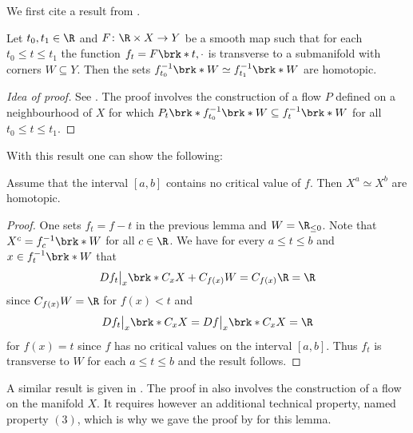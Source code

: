 % 
We first cite a result from \cite{Agrach1991}.
\begin{proposition}
  \label{pr:Morse_TransversalityLemma}
  Let $t_0,t_1\in\R$ and $F\colon \R\times X\to Y$ be a smooth map such that for each $t_0\leq t\leq t_1$ the function
  $f_t=F\brk*{t,\cdot}$ is transverse to a submanifold with corners $W\subseteq Y$.
  Then the sets $f_{t_0}^{-1}\brk*{W}\simeq f_{t_1}^{-1}\brk*{W}$
  are homotopic.
\end{proposition}
\begin{proof}[Idea of proof]
  See \cite[Theorem 2.1]{Agrach1991}.
  The proof involves the construction of a flow $P$ defined on a neighbourhood of $X$
  for which $P_t\brk*{f_{t_0}^{-1}\brk*{W}}\subseteq f_{t}^{-1}\brk*{W}$ for all $t_0\leq t\leq t_1$.
\end{proof}
With this result one can show the following:
\begin{lemma}
  \label{le:Morse_homotopicNoCP}
  Assume that the interval $[a,b]$ contains no critical value of $f$.
  Then $X^a\simeq X^b$ are homotopic.
\end{lemma}
\begin{proof}
  One sets $f_t=f-t$ in the previous lemma and $W=\R_{\leq0}$.
  Note that $X^c=f_c^{-1}\brk*{W}$ for all $c\in\R$.
  We have for every
  $a\leq t\leq b$ and $x\in f_t^{-1}\brk*{W}$ that
  \begin{align*}
    Df_t\big\vert_{x}\brk*{C_{x}X}+C_{f(x)}W=C_{f(x)}\R=\R
  \end{align*}
  since $C_{f(x)}W=\R$ for $f(x)<t$ and $$Df_t\big\vert_{x}\brk*{C_xX}=Df\big\vert_{x}\brk*{C_xX}=\R$$
  for $f(x)=t$
  since $f$ has no critical values on the interval $[a,b]$.
  Thus $f_t$ is transverse to $W$ for each $a\leq t\leq b$ and the result follows.
\end{proof}
A similar result is given in \cite[Theorem 7]{Handron2002}.
The proof in \cite[Theorem 7]{Handron2002} also involves the construction of a flow
on the manifold $X$. It requires however an additional technical property, named
property $(3)$, which is why we gave the proof by \cite{Agrach1991} for this lemma.


